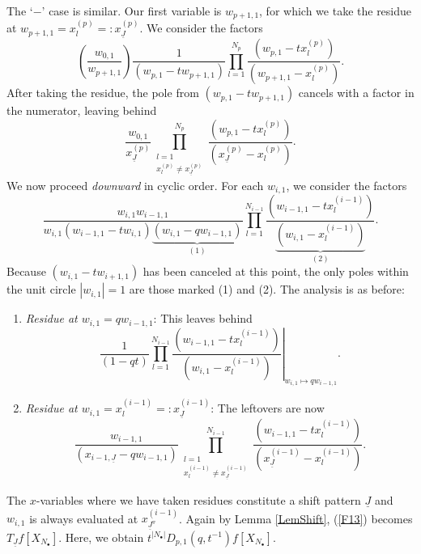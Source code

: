 \documentclass{amsart}
\newcommand{\Ju}{{\underline{J}}}
\theoremstyle{remark}
\numberwithin{thm}{section}
\numberwithin{equation}{section}
\begin{document}
The `$-$' case is similar.
Our first variable is $w_{p+1,1}$, for which we take the residue at $w_{p+1,1}=x_{l}^{(p)}=:x_{\Ju}^{(p)}$.
We consider the factors
\[
\left(\frac{w_{0,1}}{w_{p+1,1}}  \right)
\frac{1}{\left(w_{p,1}-tw_{p+1,1}\right)}
\prod_{l=1}^{N_p}
\frac{\left(w_{p,1}-tx_{l}^{(p)}  \right)}
{\left( w_{p+1,1}-x_{l}^{(p)} \right)}.
\]
After taking the residue, the pole from $(w_{p,1}-tw_{p+1,1})$ cancels with a factor in the numerator, leaving behind
\[
\frac{w_{0,1}}{x_{\Ju}^{(p)}}
\prod_{\substack{l=1\\x_{l}^{(p)}\not=x_{\Ju}^{(p)}}}^{N_p}
\frac{\left(w_{p,1}-tx_{l}^{(p)}  \right)}
{\left( x_{\Ju}^{(p)}-x_{l}^{(p)} \right)}.
\]
We now proceed \textit{downward} in cyclic order.
For each $w_{i,1}$, we consider the factors
\[
\frac{w_{i,1}w_{i-1,1}}
{w_{i,1}\left( w_{i-1,1}-tw_{i,1} \right)\underbrace{\left( w_{i,1}-qw_{i-1,1} \right)}_{(1)}}
\prod_{l=1}^{N_{i-1}}
\frac{\left( w_{i-1,1}-tx_{l}^{(i-1)} \right)}
{\underbrace{\left( w_{i,1}-x_{l}^{(i-1)} \right)}_{(2)}}.
\]
Because $\left( w_{i,1}-tw_{i+1,1} \right)$ has been canceled at this point, the only poles within the unit circle $|w_{i,1}|=1$ are those marked (1) and (2).
The analysis is as before:
\begin{enumerate}
\item \textit{Residue at $w_{i,1}=qw_{i-1,1}$}: This leaves behind
\[
\frac{1}{(1-qt)}
\prod_{l=1}^{N_{i-1}}
\left.
\frac{\left( w_{i-1,1}-tx_{l}^{(i-1)} \right)}
{\left( w_{i,1}-x_{l}^{(i-1)} \right)}\right|_{w_{i,1}\mapsto qw_{i-1,1}}.
\]
\item \textit{Residue at $w_{i,1}=x_{l}^{(i-1)}=:x_{\Ju}^{(i-1)}$}: The leftovers are now
\begin{equation}
\frac{w_{i-1,1}}{\left( x_{i-1,\Ju}-qw_{i-1,1} \right)}
\prod_{\substack{l=1\\x_{l}^{(i-1)}\not=x_{\Ju}^{(i-1)}}}^{N_{i-1}}
\frac{\left( w_{i-1,1}-tx_{l}^{(i-1)} \right)}
{\left( x_{\Ju}^{(i-1)}-x_{l}^{(i-1)} \right)}.
\label{XResF}
\end{equation}
\end{enumerate}
The $x$-variables where we have taken residues constitute a shift pattern $\Ju$ and $w_{i,1}$ is always evaluated at $x_{\Ju^\triangledown}^{(i-1)}$.
Again by Lemma \ref{LemShift}, (\ref{F13}) becomes $T_{\Ju}f\left[ X_{N_\bullet} \right]$.
Here, we obtain $t^{|N_\bullet|}D_{p,1}(q,t^{-1})f\left[ X_{N_\bullet} \right]$.
\end{document}
